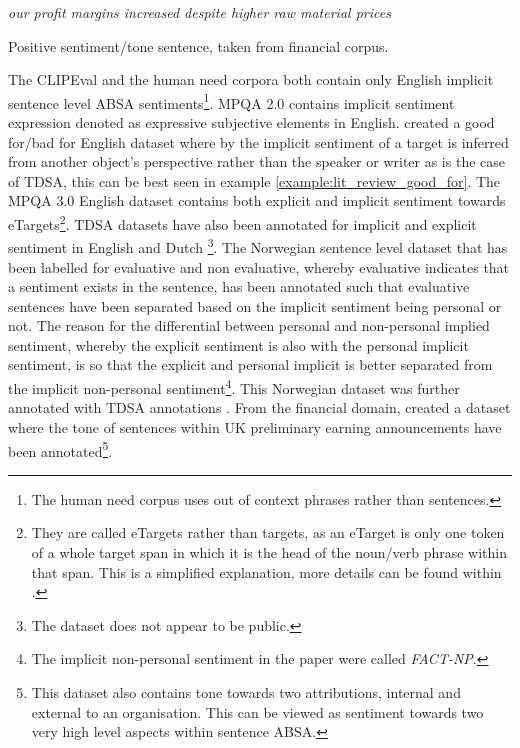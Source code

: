 \begin{example}
\textit{our profit margins increased despite higher raw material prices}
\caption{Positive sentiment/tone sentence, taken from \citet{el-haj-etal-2016-learning} financial corpus.}
\label{example:lit_review_factual_fin_sentiment}
\end{example}

The CLIPEval \citep{russo-etal-2015-semeval} and the human need \citep{ding-riloff-2018-human} corpora both contain only English implicit sentence level ABSA sentiments\footnote{The human need corpus uses out of context phrases rather than sentences.}. MPQA 2.0 \citep{wiebe2005annotating} contains implicit sentiment expression denoted as expressive subjective elements in English. \citet{deng-etal-2013-benefactive} created a good for/bad for English dataset where by the implicit sentiment of a target is inferred from another object's perspective rather than the speaker or writer as is the case of TDSA, this can be best seen in example \ref{example:lit_review_good_for}. The MPQA 3.0 English dataset \citep{deng-wiebe-2015-mpqa} contains both explicit and implicit sentiment towards eTargets\footnote{They are called eTargets rather than targets, as an eTarget is only one token of a whole target span in which it is the head of the noun/verb phrase within that span. This is a simplified explanation, more details can be found within \citet{deng-wiebe-2015-mpqa}.}. TDSA datasets have also been annotated for implicit and explicit sentiment in English \citep{toprak-etal-2010-sentence, van2015good} and Dutch \citep{van2015good}\footnote{The \citet{van2015good} dataset does not appear to be public.}. The Norwegian sentence level dataset \citep{maehlum-etal-2019-annotating} that has been labelled for evaluative and non evaluative, whereby evaluative indicates that a sentiment exists in the sentence, has been annotated such that evaluative sentences have been separated based on the implicit sentiment being personal or not. The reason for the differential between personal and non-personal implied sentiment, whereby the explicit sentiment is also with the personal implicit sentiment, is so that the explicit and personal implicit is better separated from the implicit non-personal sentiment\footnote{The implicit non-personal sentiment in the paper were called \textit{FACT-NP}.}. This Norwegian dataset was further annotated with TDSA annotations \citep{ovrelid2019fine}. From the financial domain, \citet{el-haj-etal-2016-learning} created a dataset where the tone of sentences within UK preliminary earning announcements have been annotated\footnote{This dataset also contains tone towards two attributions, internal and external to an organisation. This can be viewed as sentiment towards two very high level aspects within sentence ABSA.}.

